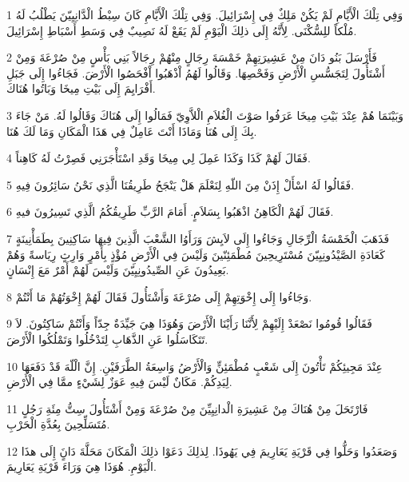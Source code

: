 \par 1 وَفِي تِلْكَ الْأَيَّامِ لَمْ يَكُنْ مَلِكٌ فِي إِسْرَائِيلَ. وَفِي تِلْكَ الْأَيَّامِ كَانَ سِبْطُ الْدَّانِيِيّنَ يَطْلُبُ لَهُ مُلْكاً للِسُّكْنَى. لِأَنَّهُ إِلَى ذلِكَ الْيَوْمِ لَمْ يَقَعْ لَهُ نَصِيبٌ فِي وَسَطِ أَسْبَاطِ إِسْرَائِيلَ.
\par 2 فَأَرْسَلَ بَنُو دَانَ مِنْ عَشِيرَتِهِمْ خَمْسَةَ رِجَالٍ مِنْهُمْ رِجَالاً بَنِي بَأْسٍ مِنْ صُرْعَةَ وَمِنْ أَشْتَأُولَ لِتَجَسُّسِ الْأَرْضِ وَفَحْصِهَا. وَقَالُوا لَهُمُ اْذْهَبُوا اْفْحَصُوا الْأَرْضَ. فَجَاءُوا إِلَى جَبَلِ أَفْرَايِمَ إِلَى بَيْتِ مِيخَا وَبَاتُوا هُنَاكَ.
\par 3 وَبَيْنَمَا هُمْ عِنْدَ بَيْتِ مِيخَا عَرَفُوا صَوْتَ الْغُلاَمِ الْلاَّوِيّ فَمَالُوا إِلَى هُنَاكَ وَقَالُوا لَهُ. مَنْ جَاءَ بِكَ إِلَى هُنَا وَمَاذَا أَنْتَ عَامِلٌ فِي هَذَا الْمَكَانِ وَمَا لَكَ هُنَا.
\par 4 فَقَالَ لَهُمْ كَذَا وَكَذَا عَمِلَ لِي مِيخَا وَقَدِ اسْتَأْجَرَنِي فَصِرْتُ لَهُ كَاهِناً.
\par 5 فَقَالُوا لَهُ اسْأَلْ إِذَنْ مِنَ اللّهِ لِنَعْلَمَ هَلْ يَنْجَحُ طَرِيقُنَا الَّذِي نَحْنُ سَائِرُونَ فِيهِ.
\par 6 فَقَالَ لَهُمْ الْكَاهِنُ اذْهَبُوا بِسَلاَمٍ. أَمَامَ الرَّبِّ طَرِيقُكُمُ الَّذِي تَسِيرُونَ فيهِ.
\par 7 فَذَهَبَ الْخَمْسَةُ الْرِّجَالِ وَجَاءُوا إِلَى لاَيِشَ وَرَأَوُا الشَّعْبَ الَّذِينَ فِيهَا سَاكِنِينَ بِطَمَأْنِينَةٍ كَعَادَةِ الصَّيْدُونِيِيّنَ مُسْتَرِيحِينَ مُطْمَئِنّينَ وَلَيْسَ فِي الْأَرْضِ مُؤْذٍ بِأَمْرٍ وَارِثٍ رِيَاسةً وَهُمْ بَعِيدُونَ عَنِ الصِّيدُونِيِيّنَ وَلَيْسَ لَهُمْ أَمْرٌ مَعَ إِنْسَانٍ.
\par 8 وَجَاءُوا إِلَى إِخْوَتِهِمْ إِلَى صُرْعَةَ وَأَشْتَأُولَ فَقَالَ لَهُمْ إِخْوَتُهُمْ مَا أَنْتُمْ.
\par 9 فَقَالُوا قُومُوا نَصْعَدْ إِلَيْهِمْ لِأَنَّنَا رَأَيْنَا الْأَرْضَ وَهُوَذَا هِيَ جَيِّدَةٌ جِدّاً وَأَنْتُمْ سَاكِتُونَ. لاَ تَتَكَاسَلُوا عَنِ الذَّهَابِ لِتَدْخُلُوا وَتَمْلُكُوا الْأَرْضَ.
\par 10 عِنْدَ مَجِيئِكُمْ تَأْتُونَ إِلَى شَعْبٍ مُطْمَئِنٍّ وَالْأَرْضُ وَاسِعَةُ الطَّرَفَيْنِ. إِنَّ الْلّهَ قَدْ دَفَعَهَا لِيَدِكُمْ. مَكَانٌ لَيْسَ فِيهِ عَوَزٌ لِشَيْءٍ ممَّا فِي الْأَرْضِ.
\par 11 فَارْتَحَلَ مِنْ هُنَاكَ مِنْ عَشِيرَةِ الْدانِيِيِّنَ مِنْ صُرْعَةَ وَمِنْ أَشْتَأُولَ سِتُّ مِئَةِ رَجُلٍ مُتَسَلِّحِينَ بِعُدَّةِ الْحَرْبِ.
\par 12 وَصَعَدُوا وَحَلُّوا فِي قَرْيَةِ يَعَارِيمَ فِي يَهُوذَا. لِذلِكَ دَعَوْا ذلِكَ الْمَكَانَ مَحَلَّةَ دَانٍَ إِلَى هذَا الْيَوْمِ. هُوَذَا هِيَ وَرَاءَ قَرْيَةِ يَعَارِيمَ.
